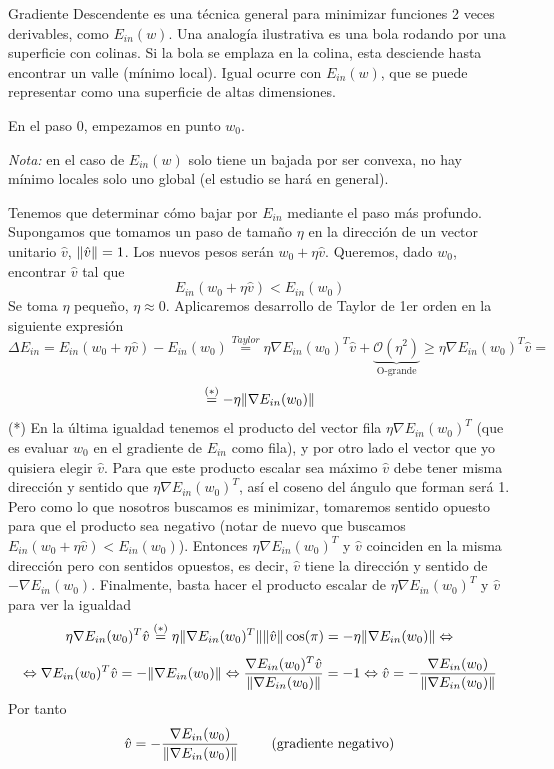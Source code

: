\documentclass[11pt,a4paper]{article}
\DeclarePairedDelimiter{\norm}{\lVert}{\rVert}
\theoremstyle{definition}
\begin{document}
	Gradiente Descendente es una técnica general para minimizar funciones 2 veces derivables, como $E_{in}(w)$. Una analogía ilustrativa es una bola rodando por una superficie con colinas. Si la bola se emplaza en la colina, esta desciende hasta encontrar un valle (mínimo local). Igual ocurre con $E_{in}(w)$, que se puede representar como una superficie de altas dimensiones.
	
	 En el paso 0, empezamos en punto $w_0$.
	
	\textit{Nota:}  en el caso de $E_{in}(w)$ solo tiene un bajada por ser convexa, no hay mínimo locales solo uno global (el estudio se hará en general).
	
	Tenemos que determinar cómo bajar por $E_{in}$ mediante el paso más profundo. Supongamos que tomamos un paso de tamaño $\eta$ en la dirección de un vector unitario $\hat v$, $\norm{\hat v}=1$. Los nuevos pesos serán $w_0+\eta \hat v$. Queremos, dado $w_0$, encontrar $\hat v$ tal que $$E_{in}(w_0+\eta \hat v)<E_{in}(w_0)$$
Se toma $\eta$ pequeño, $\eta \approx 0$. Aplicaremos desarrollo de Taylor de 1er orden en la siguiente expresión
	$$\Delta E_{in}=E_{in}(w_0+\eta \hat v) - E_{in}(w_0)\stackrel{Taylor}{=} \eta \nabla E_{in}(w_0)^T\hat v + \underbrace{\mathcal{O}(\eta ^2)}_{\text{O-grande}} \geq  \eta \nabla E_{in}(w_0)^T\hat v  =$$ $$ \stackrel{(*)}{=}-\eta \norm{\nabla E_{in}(w_0)}$$
	(*) En la última igualdad tenemos el producto del vector fila $\eta \nabla E_{in}(w_0)^T$ (que es evaluar $w_0$ en el gradiente de $E_{in}$ como fila), y por otro lado el vector que yo quisiera elegir $\hat v$. Para que este producto escalar sea máximo $\hat v$ debe tener misma dirección y sentido que $\eta \nabla E_{in}(w_0)^T$, así el coseno del ángulo que forman será 1. Pero como lo que nosotros buscamos es minimizar, tomaremos sentido opuesto para que el producto sea negativo (notar de nuevo que buscamos $E_{in}(w_0+\eta \hat v)<E_{in}(w_0)$). Entonces $\eta \nabla E_{in}(w_0)^T$ y $\hat v$ coinciden en la misma dirección pero con sentidos opuestos, es decir, $\hat v$ tiene la dirección y sentido de $-\nabla E_{in}(w_0)$. Finalmente, basta hacer el producto escalar de $\eta \nabla E_{in}(w_0)^T$ y $\hat v$  para ver la igualdad $$\eta \nabla E_{in}(w_0)^T \hat v\stackrel{(*)}{=} \eta \norm{\nabla E_{in}(w_0)^T} \norm{\hat v} \cos(\pi)=-\eta \norm{\nabla E_{in}(w_0)} \Leftrightarrow$$
	$$\Leftrightarrow \nabla E_{in}(w_0)^T \hat v= -\norm{\nabla E_{in}(w_0)} \Leftrightarrow \frac{\nabla E_{in}(w_0)^T \hat v}{\norm{\nabla E_{in}(w_0)}}= -1 \Leftrightarrow \hat v=-\frac{\nabla E_{in}(w_0)}{\norm{\nabla E_{in}(w_0)}}$$
	Por tanto
	$$\hat v=-\frac{\nabla E_{in}(w_0)}{\norm{\nabla E_{in}(w_0)}}\quad \quad \text{ (gradiente negativo)}$$
	
\end{document}
